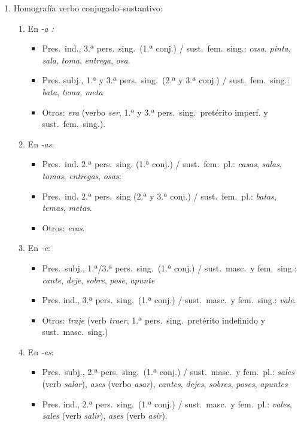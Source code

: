 \begin{enumerate} \item Homografía verbo conjugado--sustantivo: \begin{enumerate} 

\item En \emph{-a :} \begin{itemize} \item Pres.\ ind., 3.ª pers.\  sing.\ (1.ª conj.) / sust.\ fem.\ sing.: \emph{casa}, \emph{pinta}, \emph{ sala}, \emph{toma}, \emph{entrega}, \emph{osa}. \item Pres. subj., 1.ª y 3.ª pers.\ sing.\ (2.ª y 3.ª conj.) / sust.\ fem.\ sing.: \emph{bata}, \emph{tema}, \emph{meta} \item Otros: \emph{era} (verbo \emph{ser}, 1.ª y 3.ª pers.\ sing.\ pretérito imperf.  y sust.\ fem.\  sing.). \end{itemize} 

\item En \emph{-as}: \begin{itemize} \item Pres.\ ind. 2.ª pers.\ sing. (1.ª conj.) / sust.\ fem.\ pl.: \emph{casas}, \emph{salas}, \emph{tomas}, \emph{entregas}, \emph{osas}; \item Pres.\ ind. 2.ª pers.\ sing (2.ª y 3.ª conj.) / sust.\ fem.\ pl.: \emph{batas}, \emph{temas}, \emph{metas}. \item Otros: \emph{eras}. \end{itemize} 

\item En \emph{-e}: \begin{itemize} \item Pres.\ subj., 1.ª/3.ª pers.\ sing.\ (1.ª conj.) / sust.\ masc.\  y fem.\ sing.: \emph{cante}, \emph{deje}, \emph{sobre}, \emph{pose}, \emph{apunte} \item Pres. ind., 3.ª pers.\ sing.\ (1.ª conj.) / sust.\ masc.\  y fem.\ sing.: \emph{vale}. \item Otros: \emph{traje} (verb \emph{traer}, 1.ª pers.\ sing.\ pretérito indefinido y sust.\ masc.\ sing.) \end{itemize} 

\item En \emph{-es}: \begin{itemize} \item Pres.\ subj., 2.ª pers.\ sing.\ (1.ª conj.) / sust.\ masc.\  y fem.\ pl.: \emph{sales} (verb \emph{salar}), \emph{ases} (verbo \emph{asar}), \emph{cantes}, \emph{dejes}, \emph{sobres}, \emph{poses}, \emph{apuntes} \item Pres. ind., 2.ª pers.\ sing.\ (1.ª conj.) / sust.\ masc.\  y fem.\ pl.: \emph{vales}, \emph{sales} (verb \emph{salir}), \emph{ases} (verb \emph{asir}). \end{itemize} 


\end{enumerate}
\end{enumerate}
